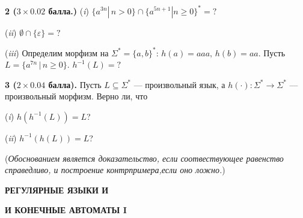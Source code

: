 \documentclass[10pt,twocolumn]{article}
\let\eps\varepsilon
\def\s{\Sigma }
\def\ss{\Sigma^* }
\def\ra{\rightarrow}
\begin{document}
\smallskip


{\bf 2
($3 \times 0.02$ балла.)}
\noindent ({\em i})
$\{ a^{3n} | \, n>0\} \cap \{ a^{5n+1} | n \geq 0\}^* =?$

\noindent ({\em ii}) $\emptyset \cap \{\eps\} =?$

\noindent ({\em iii})
Определим морфизм на $\s^*=\{a,b\}^*$: $h(a)=aaa, \, h(b)=aa$.
Пусть $L=\{a^{7n} \, | \, n\geq 0\}$. 
$h^{-1}(L)=?$

\smallskip

{\bf 3 ($2 \times 0.04$ балла).} 
Пусть $L \subseteq \ss$ --- произвольный
язык, а $h(\cdot): \ss \ra \ss$ --- произвольный морфизм. Верно ли,
что

\noindent ({\em i})  $h (h^{-1}(L)) = L$?

\noindent ({\em ii}) $h^{-1}(h(L)) = L$?

({\em Обоснованием является доказательство, если
соотвествующее равенство справедливо, и построение контр\-примера,если
оно ложно.})


\medskip

\centerline{\bf РЕГУЛЯРНЫЕ ЯЗЫКИ И}
\centerline{\bf И КОНЕЧНЫЕ АВТОМАТЫ I}
\end{document}
